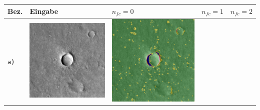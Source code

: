 \begin{table}[h!]
	\setlength\tabcolsep{0pt}
	\begin{tabularx}{\textwidth}{>{\centering}m{}
			>{\centering}m{}
			>{\centering}m{}
			>{\centering}m{}
			>{\centering\arraybackslash}m{}}
		\toprule
		Bez. &
		Eingabe & 
		$n_{fc}=0$ &
		$n_{fc}=1$ &
		$n_{fc}=2$ \\
		\midrule
		\texttt{a)} &
		\includegraphics[width=0.9\linewidth]{images/p03/p03_01.png} &
		\includegraphics[width=0.9\linewidth]{images/gen/fully_connected/p03_01.png_0.png} &

\end{tabularx}
\end{table}

